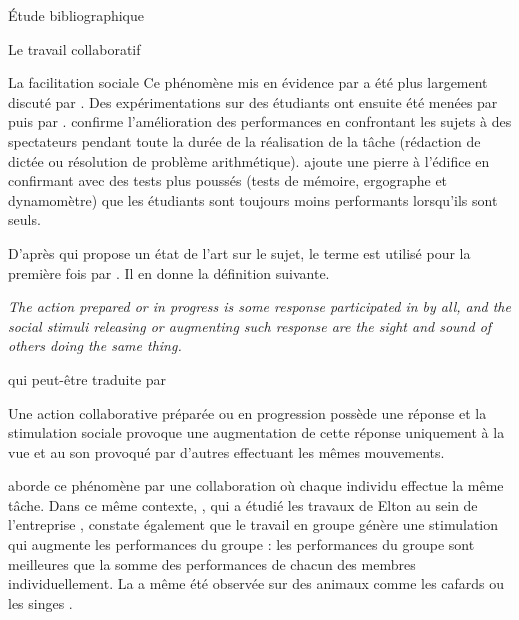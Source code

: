 \documentclass[myfrancais,ngerman,english,frenchb]{mythesis}
\begin{document}
\begin{mychapter}{Étude bibliographique}
\begin{mysection}{Le travail collaboratif}
\begin{mysubsection}{La facilitation sociale}
				Ce phénomène mis en évidence par  a été plus largement discuté par .
				Des expérimentations sur des étudiants ont ensuite été menées par  puis par .
				 confirme l'amélioration des performances en confrontant les sujets à des spectateurs pendant toute la durée de la réalisation de la tâche (rédaction de dictée ou résolution de problème arithmétique).
				 ajoute une pierre à l'édifice en confirmant avec des tests plus poussés (tests de mémoire, ergographe et dynamomètre) que les étudiants sont toujours moins performants lorsqu'ils sont seuls.

				D'après  qui propose un état de l'art sur le sujet, le terme  est utilisé pour la première fois par .
				Il en donne la définition suivante.
				\begin{myquote}[english]
					\it The action prepared or in progress is some response participated in by all, and the social stimuli releasing or augmenting such response are the sight and sound of others doing the same thing.
				\end{myquote}
				qui peut-être traduite par
				\begin{myquote}[frenchb]
					Une action collaborative préparée ou en progression possède une réponse et la stimulation sociale provoque une augmentation de cette réponse uniquement à la vue et au son provoqué par d’autres effectuant les mêmes mouvements.
				\end{myquote}

				 aborde ce phénomène par une collaboration où chaque individu effectue la même tâche.
				Dans ce même contexte, , qui a étudié les travaux de Elton  au sein de l'entreprise \myHawthorne, constate également que le travail en groupe génère une stimulation qui augmente les performances du groupe : les performances du groupe sont meilleures que la somme des performances de chacun des membres individuellement.
				La  a même été observée sur des animaux comme les cafards  ou les singes .


\end{mysubsection}
\end{mysection}
\end{mychapter}
\end{document}

